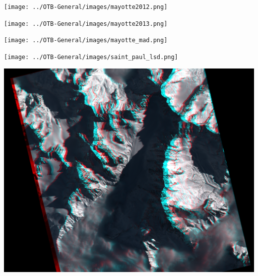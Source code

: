 \documentclass[8pt]{beamer}
\begin{document}
\begin{frame}[plain]
\hspace*{-11mm}
    \texttt{[image: ../OTB-General/images/mayotte2012.png]}
\end{frame}

\vspace*{-6.5mm}
\begin{frame}[plain]
\hspace*{-11mm}
    \texttt{[image: ../OTB-General/images/mayotte2013.png]}
\end{frame}

\vspace*{-6.5mm}
\begin{frame}[plain]
\hspace*{-11mm}
    \texttt{[image: ../OTB-General/images/mayotte\_mad.png]}
\end{frame}

\vspace*{-6.5mm}
\begin{frame}[plain]
\hspace*{-11mm}
\texttt{[image: ../OTB-General/images/saint\_paul\_lsd.png]}
\end{frame}

\vspace*{-6.5mm}
\begin{frame}[plain]
\hspace*{-11mm}
    \includegraphics[keepaspectratio,width=1.005\paperwidth,height=1.1\paperheight]{../OTB-General/images/argentiere_anaglyphe.png}
\end{frame}
\end{document}
